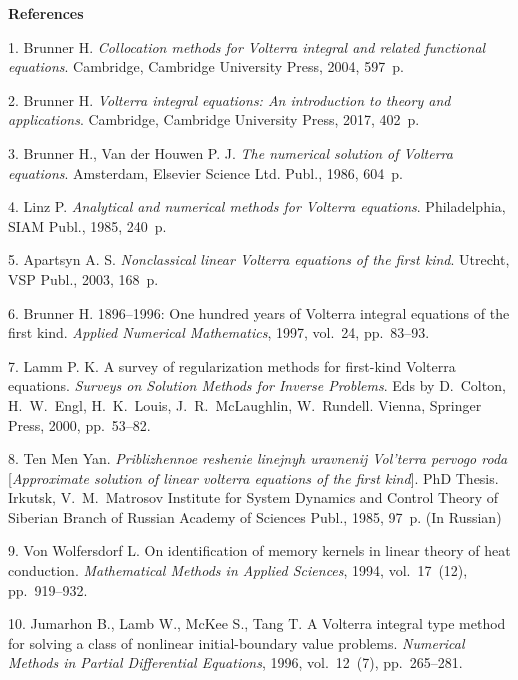 

{\small



\vskip6mm

\noindent \textbf{References} }

\vskip 2mm

{\footnotesize

1. Brunner  H. {\it Collocation methods for Volterra integral and
related functional equations}. Cambridge, Cambridge University
Press, 2004, 597~p.

2. Brunner H. {\it Volterra integral equations: An introduction to
theory and  applications}. Cambridge, Cambridge University Press,
2017, 402~p.

3. Brunner H., Van der Houwen P. J. {\it The numerical solution of
Volterra equations}. Amsterdam, Elsevier Science Ltd. Publ.,
1986, 604~p.

4. Linz  P.  {\it Analytical and numerical methods for Volterra
equations}. Philadelphia, SIAM Publ.,  1985, 240~p.

5. Apartsyn A. S.  {\it Nonclassical linear Volterra equations of
the first kind}. Utrecht, VSP Publ., 2003, 168~p.

6. Brunner  H.  1896--1996: One hundred years of Volterra integral
equations of the first kind. {\it Applied Numerical Mathematics},
1997, vol.~24, pp.~83--93.

7. Lamm P. K. A survey of regularization methods for first-kind
Volterra equations.  {\it Surveys on Solution Methods for Inverse
Problems}. Eds by D.~Colton, H.~W.~Engl, H.~K.~Louis,
J.~R.~McLaughlin, W.~Rundell. Vienna, Springer Press, 2000,
pp.~53--82.

8. Ten Men Yan. {\it Priblizhennoe reshenie linejnyh uravnenij
Vol'terra pervogo roda} [{\it Approximate solution of linear
volterra equations of the first kind}]. PhD Thesis. Irkutsk,
V.~M.~Matrosov Institute for System Dynamics and Control Theory of
Siberian Branch of Russian Academy of Sciences Publ., 1985, 97~p.
(In Russian)

9. Von Wolfersdorf L. On identification of memory kernels in
linear theory of heat conduction. {\it Mathematical Methods in
Applied Sciences}, 1994, vol.~17~(12), pp.~919--932.

10. Jumarhon B., Lamb W., McKee S., Tang T. A Volterra integral
type method for solving a class of nonlinear initial-boundary
value problems. {\it Numerical Methods in Partial Differential
Equations}, 1996, vol.~12~(7), pp.~265--281.

}

